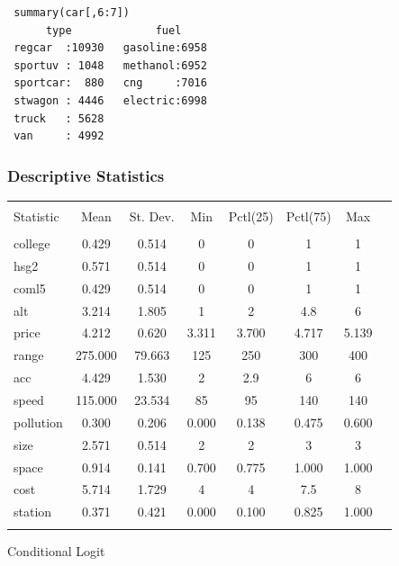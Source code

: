 \documentclass{beamer}
\newcommand{\1}{\mathbb{1}}
\begin{document}
\begin{verbatim}
 summary(car[,6:7])
      type             fuel     
 regcar  :10930   gasoline:6958  
 sportuv : 1048   methanol:6952  
 sportcar:  880   cng     :7016  
 stwagon : 4446   electric:6998  
 truck   : 5628                  
 van     : 4992                  
 \end{verbatim}

 \begin{frame}\frametitle{Descriptive Statistics}
\begin{table}[!htbp] \centering 
\tiny
\begin{tabular}{@{\extracolsep{5pt}}lccccccc} 
\\[-1.8ex]\hline 
\hline \\[-1.8ex] 
Statistic  & \multicolumn{1}{c}{Mean} & \multicolumn{1}{c}{St. Dev.} & \multicolumn{1}{c}{Min} & \multicolumn{1}{c}{Pctl(25)} & \multicolumn{1}{c}{Pctl(75)} & \multicolumn{1}{c}{Max} \\ 
\hline \\[-1.8ex] 
college  & 0.429 & 0.514 & 0 & 0 & 1 & 1 \\ 
hsg2  & 0.571 & 0.514 & 0 & 0 & 1 & 1 \\ 
coml5  & 0.429 & 0.514 & 0 & 0 & 1 & 1 \\ 
alt  & 3.214 & 1.805 & 1 & 2 & 4.8 & 6 \\ 
price  & 4.212 & 0.620 & 3.311 & 3.700 & 4.717 & 5.139 \\ 
range  & 275.000 & 79.663 & 125 & 250 & 300 & 400 \\ 
acc  & 4.429 & 1.530 & 2 & 2.9 & 6 & 6 \\ 
speed  & 115.000 & 23.534 & 85 & 95 & 140 & 140 \\ 
pollution  & 0.300 & 0.206 & 0.000 & 0.138 & 0.475 & 0.600 \\ 
size & 2.571 & 0.514 & 2 & 2 & 3 & 3 \\ 
space  & 0.914 & 0.141 & 0.700 & 0.775 & 1.000 & 1.000 \\ 
cost  & 5.714 & 1.729 & 4 & 4 & 7.5 & 8 \\ 
station & 0.371 & 0.421 & 0.000 & 0.100 & 0.825 & 1.000 \\ 
\hline \\[-1.8ex] 
\end{tabular} 
\end{table} 
\end{frame}

\begin{frame}{Conditional Logit}

\end{frame}
\end{document}
